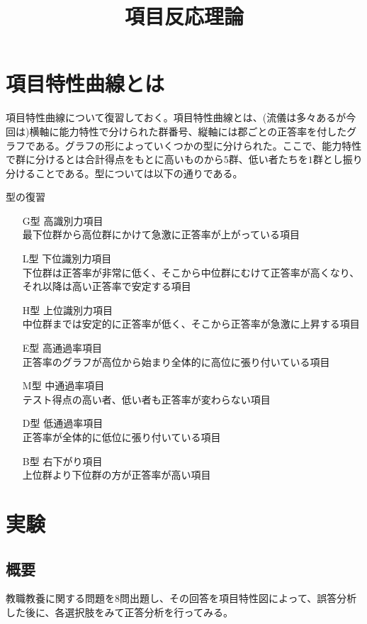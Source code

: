 \documentclass[12pt]{jarticle}
\title{項目反応理論}
\begin{document}
\maketitle
\section{項目特性曲線とは}
項目特性曲線について復習しておく。項目特性曲線とは、(流儀は多々あるが今回は)横軸に能力特性で分けられた群番号、縦軸には郡ごとの正答率を付したグラフである。グラフの形によっていくつかの型に分けられた。ここで、能力特性で群に分けるとは合計得点をもとに高いものから$5$群、低い者たちを$1$群とし振り分けることである。型については以下の通りである。%
\begin{itembox}[l]{型の復習}
  \begin{itemize}
    \item[G型]  高識別力項目\\最下位群から高位群にかけて急激に正答率が上がっている項目
    \item[L型]  下位識別力項目\\下位群は正答率が非常に低く、そこから中位群にむけて正答率が高くなり、それ以降は高い正答率で安定する項目
    \item[H型]  上位識別力項目\\中位群までは安定的に正答率が低く、そこから正答率が急激に上昇する項目
    \item[E型]  高通過率項目\\正答率のグラフが高位から始まり全体的に高位に張り付いている項目
    \item[M型]  中通過率項目\\テスト得点の高い者、低い者も正答率が変わらない項目
    \item[D型]  低通過率項目\\正答率が全体的に低位に張り付いている項目
    \item[B型]  右下がり項目\\上位群より下位群の方が正答率が高い項目
  \end{itemize}
\end{itembox}
\section{実験}
\subsection{概要}
教職教養に関する問題を$8$問出題し、その回答を項目特性図によって、誤答分析した後に、各選択肢をみて正答分析を行ってみる。
\end{document}
